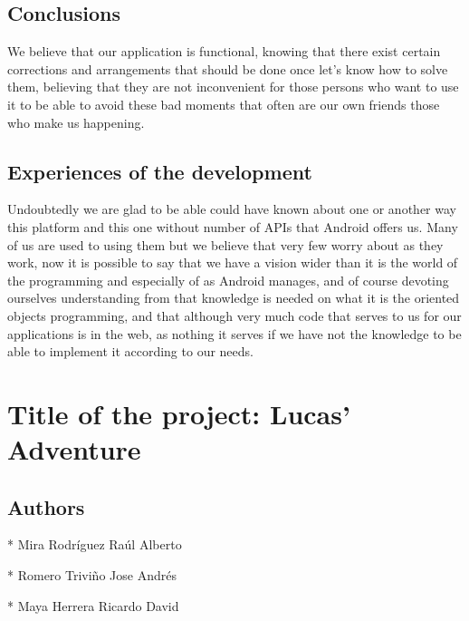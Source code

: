 \documentclass[12pt,letterpaper]{article}
\begin{document}
   
  \subsection{Conclusions}
  
 We believe that our application is functional, knowing that there exist certain corrections and arrangements that should be done once let's know how to solve them, believing that they are not inconvenient for those persons who want to use it to be able to avoid these bad moments that often are our own friends those who make us happening.
  
  
   \subsection{Experiences of the development}
Undoubtedly we are glad to be able could have known about one or another way this platform and this one without number of APIs that Android offers us. Many of us are used to using them but we believe that very few worry about as they work, now it is possible to say that we have a vision wider than it is the world of the programming and especially of as Android manages, and of course devoting ourselves understanding from that knowledge is needed on what it is the oriented objects programming, and that although very much code that serves to us for our applications is in the web, as nothing it serves if we have not the knowledge to be able to implement it according to our needs.

\newpage
\section{Title of the project: Lucas' Adventure}

\subsection{Authors}

* Mira Rodríguez Raúl Alberto

* Romero Triviño Jose Andrés

* Maya Herrera Ricardo David
\end{document}
